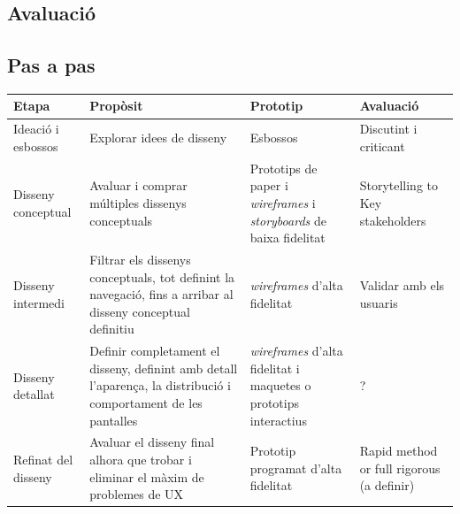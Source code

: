 \subsection{Avaluació}

\subsection{Pas a pas}
\begin{tabular}{ | p{1.8cm} | p{5cm} | p{3cm} | p{3cm} |}
\hline
\textbf{Etapa} & \textbf{Propòsit} & \textbf{Prototip} & \textbf{Avaluació} \\
\hline
Ideació i esbossos & Explorar idees de disseny & Esbossos & Discutint i criticant \\
\hline
Disseny conceptual & Avaluar i comprar múltiples dissenys conceptuals & Prototips de paper i \textit{wireframes} i \textit{storyboards} de baixa fidelitat &  Storytelling to Key stakeholders\\ %
\hline
Disseny intermedi & Filtrar els dissenys conceptuals, tot definint la navegació, fins a arribar al disseny conceptual definitiu & \textit{wireframes} d'alta fidelitat & Validar amb els usuaris\\
\hline
Disseny detallat & Definir completament el disseny, definint amb detall l'aparença, la distribució i comportament de les pantalles & \textit{wireframes} d'alta fidelitat i maquetes o prototips interactius & ? \\
\hline
Refinat del disseny & Avaluar el disseny final alhora que trobar i eliminar el màxim de problemes de \ac{UX} & Prototip programat d'alta fidelitat& Rapid method or full rigorous (a definir)\\ %
\hline
\end{tabular}